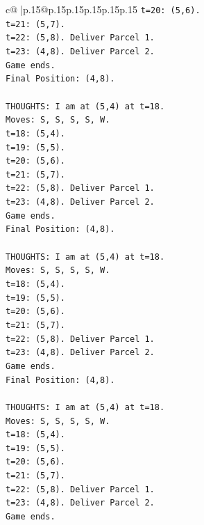 \documentclass{article}
\begin{document}
{\begin{supertabular}{c@{$\;$}|p{.15\linewidth}@{}p{.15\linewidth}p{.15\linewidth}p{.15\linewidth}p{.15\linewidth}p{.15\linewidth}}
{{{\texttt{t=20: (5,6).} \\
\texttt{t=21: (5,7).} \\
\texttt{t=22: (5,8). Deliver Parcel 1.} \\
\texttt{t=23: (4,8). Deliver Parcel 2.} \\
\texttt{Game ends.} \\
\texttt{Final Position: (4,8).} \\
\\ 
\texttt{THOUGHTS: I am at (5,4) at t=18.} \\
\texttt{Moves: S, S, S, S, W.} \\
\texttt{t=18: (5,4).} \\
\texttt{t=19: (5,5).} \\
\texttt{t=20: (5,6).} \\
\texttt{t=21: (5,7).} \\
\texttt{t=22: (5,8). Deliver Parcel 1.} \\
\texttt{t=23: (4,8). Deliver Parcel 2.} \\
\texttt{Game ends.} \\
\texttt{Final Position: (4,8).} \\
\\ 
\texttt{THOUGHTS: I am at (5,4) at t=18.} \\
\texttt{Moves: S, S, S, S, W.} \\
\texttt{t=18: (5,4).} \\
\texttt{t=19: (5,5).} \\
\texttt{t=20: (5,6).} \\
\texttt{t=21: (5,7).} \\
\texttt{t=22: (5,8). Deliver Parcel 1.} \\
\texttt{t=23: (4,8). Deliver Parcel 2.} \\
\texttt{Game ends.} \\
\texttt{Final Position: (4,8).} \\
\\ 
\texttt{THOUGHTS: I am at (5,4) at t=18.} \\
\texttt{Moves: S, S, S, S, W.} \\
\texttt{t=18: (5,4).} \\
\texttt{t=19: (5,5).} \\
\texttt{t=20: (5,6).} \\
\texttt{t=21: (5,7).} \\
\texttt{t=22: (5,8). Deliver Parcel 1.} \\
\texttt{t=23: (4,8). Deliver Parcel 2.} \\
\texttt{Game ends.} \\
}}}
\end{supertabular}}
\end{document}
